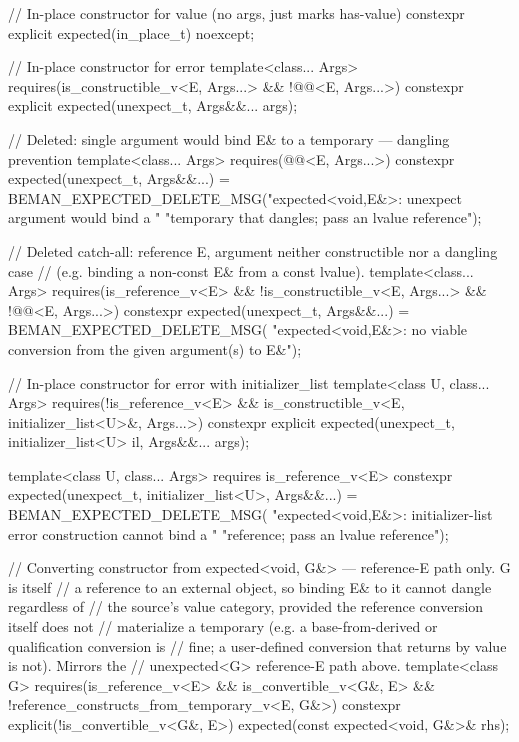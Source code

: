 \begin{codeblock}
{{    // In-place constructor for value (no args, just marks has-value)
    constexpr explicit expected(in_place_t) noexcept;

    // In-place constructor for error
    template<class... Args>
      requires(is_constructible_v<E, Args...> && !@@<E, Args...>)
    constexpr explicit expected(unexpect_t, Args&&... args);

    // Deleted: single argument would bind E& to a temporary — dangling prevention
    template<class... Args>
      requires(@@<E, Args...>)
    constexpr expected(unexpect_t, Args&&...) =
        BEMAN_EXPECTED_DELETE_MSG("expected<void,E&>: unexpect argument would bind a "
                                  "temporary that dangles; pass an lvalue reference");

    // Deleted catch-all: reference E, argument neither constructible nor a dangling case
    // (e.g. binding a non-const E& from a const lvalue).
    template<class... Args>
      requires(is_reference_v<E> && !is_constructible_v<E, Args...> &&
               !@@<E, Args...>)
    constexpr expected(unexpect_t, Args&&...) = BEMAN_EXPECTED_DELETE_MSG(
        "expected<void,E&>: no viable conversion from the given argument(s) to E&");

    // In-place constructor for error with initializer_list
    template<class U, class... Args>
      requires(!is_reference_v<E> && is_constructible_v<E, initializer_list<U>&, Args...>)
    constexpr explicit expected(unexpect_t, initializer_list<U> il, Args&&... args);

    template<class U, class... Args>
      requires is_reference_v<E>
    constexpr expected(unexpect_t, initializer_list<U>, Args&&...) =
        BEMAN_EXPECTED_DELETE_MSG(
            "expected<void,E&>: initializer-list error construction cannot bind a "
            "reference; pass an lvalue reference");

    // Converting constructor from expected<void, G&> — reference-E path only. G is itself
    // a reference to an external object, so binding E& to it cannot dangle regardless of
    // the source's value category, provided the reference conversion itself does not
    // materialize a temporary (e.g. a base-from-derived or qualification conversion is
    // fine; a user-defined conversion that returns by value is not). Mirrors the
    // unexpected<G> reference-E path above.
    template<class G>
      requires(is_reference_v<E> && is_convertible_v<G&, E> &&
               !reference_constructs_from_temporary_v<E, G&>)
    constexpr explicit(!is_convertible_v<G&, E>) expected(const expected<void, G&>& rhs);

}}
\end{codeblock}
